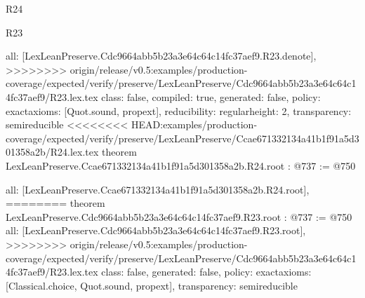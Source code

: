 \begin{lexlean}{R24}
\begin{lexlean}{R23}
\begin{coremodule}
{{{{{  all: [LexLeanPreserve.Cdc9664abb5b23a3e64c64c14fc37aef9.R23.denote],
>>>>>>>> origin/release/v0.5:examples/production-coverage/expected/verify/preserve/LexLeanPreserve/Cdc9664abb5b23a3e64c64c14fc37aef9/R23.lex.tex
  class: false,
  compiled: true,
  generated: false,
  policy: exact{axioms: [Quot.sound, propext]},
  reducibility: regular{height: 2},
  transparency: semireducible
}
<<<<<<<< HEAD:examples/production-coverage/expected/verify/preserve/LexLeanPreserve/Ccae671332134a41b1f91a5d301358a2b/R24.lex.tex
theorem LexLeanPreserve.Ccae671332134a41b1f91a5d301358a2b.R24.root : @737 := @750 {
  all: [LexLeanPreserve.Ccae671332134a41b1f91a5d301358a2b.R24.root],
========
theorem LexLeanPreserve.Cdc9664abb5b23a3e64c64c14fc37aef9.R23.root : @737 := @750 {
  all: [LexLeanPreserve.Cdc9664abb5b23a3e64c64c14fc37aef9.R23.root],
>>>>>>>> origin/release/v0.5:examples/production-coverage/expected/verify/preserve/LexLeanPreserve/Cdc9664abb5b23a3e64c64c14fc37aef9/R23.lex.tex
  class: false,
  generated: false,
  policy: exact{axioms: [Classical.choice, Quot.sound, propext]},
  transparency: semireducible
}

}}}}}
\end{coremodule}
\end{lexlean}
\end{lexlean}
